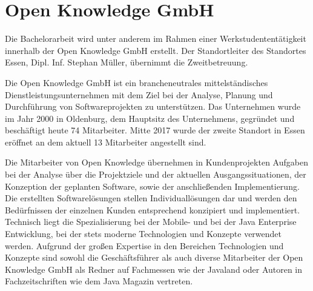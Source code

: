\section{Open Knowledge GmbH}


Die Bachelorarbeit wird unter anderem im Rahmen einer Werkstudententätigkeit innerhalb der Open Knowledge GmbH erstellt. Der Standortleiter des Standortes Essen, Dipl. Inf. Stephan Müller, übernimmt die Zweitbetreuung.

Die Open Knowledge GmbH ist ein brancheneutrales mittelständisches Dienstleistungsunternehmen mit dem Ziel bei der Analyse, Planung und Durchführung von Softwareprojekten zu unterstützen. Das Unternehmen wurde im Jahr 2000 in Oldenburg, dem Hauptsitz des Unternehmens, gegründet und beschäftigt heute 74 Mitarbeiter. Mitte 2017 wurde der zweite Standort in Essen eröffnet an dem aktuell 13 Mitarbeiter angestellt sind.

Die Mitarbeiter von Open Knowledge übernehmen in Kundenprojekten Aufgaben bei der Analyse über die Projektziele und der aktuellen Ausgangssituationen, der Konzeption der geplanten Software, sowie der anschließenden Implementierung. Die erstellten Softwarelösungen stellen Individuallösungen dar und werden den Bedürfnissen der einzelnen Kunden entsprechend konzipiert und implementiert. Technisch liegt die Spezialisierung bei der Mobile- und bei der Java Enterprise Entwicklung, bei der stets moderne Technologien und Konzepte verwendet werden. Aufgrund der großen Expertise in den Bereichen Technologien und Konzepte sind sowohl die Geschäftsführer als auch diverse Mitarbeiter der Open Knowledge GmbH als Redner auf Fachmessen wie der Javaland oder Autoren in Fachzeitschriften wie dem Java Magazin vertreten. \cite{VincentOpenKnowledge} %

%
